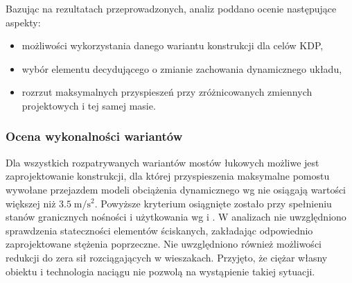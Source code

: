 Bazując na rezultatach przeprowadzonych, analiz poddano ocenie następujące aspekty:
\begin{itemize}
\item możliwości wykorzystania danego wariantu konstrukcji dla celów KDP,
\item wybór elementu decydującego o zmianie zachowania dynamicznego układu,
\item rozrzut maksymalnych przyspieszeń przy zróżnicowanych zmiennych projektowych i tej samej masie.
\end{itemize}

\subsubsection{Ocena wykonalności wariantów}
Dla wszystkich rozpatrywanych wariantów mostów łukowych możliwe jest zaprojektowanie konstrukcji, dla której przyspieszenia maksymalne pomostu wywołane przejazdem modeli obciążenia dynamicznego wg \cite{PKNj} nie osiągają wartości większej niż $3.5\;\mathrm{m/s^2}$. Powyższe kryterium osiągnięte zostało przy spełnieniu stanów granicznych nośności i użytkowania wg \cite{PKNc} i \cite{PKNj}. W analizach nie uwzględniono sprawdzenia stateczności elementów ściskanych, zakładając odpowiednio zaprojektowane stężenia poprzeczne. Nie uwzględniono również możliwości redukcji do zera sił rozciągających w wieszakach. Przyjęto, że ciężar własny obiektu i technologia naciągu nie pozwolą na wystąpienie takiej sytuacji.

